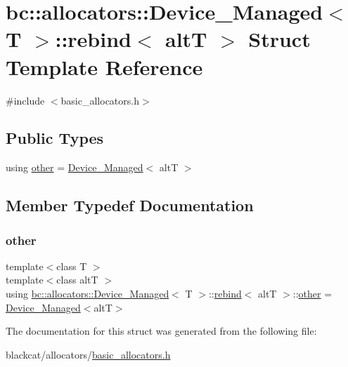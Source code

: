 \hypertarget{structbc_1_1allocators_1_1Device__Managed_1_1rebind}{}\section{bc\+:\+:allocators\+:\+:Device\+\_\+\+Managed$<$ T $>$\+:\+:rebind$<$ altT $>$ Struct Template Reference}
\label{structbc_1_1allocators_1_1Device__Managed_1_1rebind}


{\ttfamily \#include $<$basic\+\_\+allocators.\+h$>$}

\subsection*{Public Types}
\begin{DoxyCompactItemize}
\item 
using \hyperlink{structbc_1_1allocators_1_1Device__Managed_1_1rebind_a112cc45d6e68d7087b8951691a11f202}{other} = \hyperlink{structbc_1_1allocators_1_1Device__Managed}{Device\+\_\+\+Managed}$<$ altT $>$
\end{DoxyCompactItemize}


\subsection{Member Typedef Documentation}
\mbox{\label{structbc_1_1allocators_1_1Device__Managed_1_1rebind_a112cc45d6e68d7087b8951691a11f202}} 
\subsubsection{\texorpdfstring{other}{other}}
{\footnotesize\ttfamily template$<$class T $>$ \\
template$<$class altT $>$ \\
using \hyperlink{structbc_1_1allocators_1_1Device__Managed}{bc\+::allocators\+::\+Device\+\_\+\+Managed}$<$ T $>$\+::\hyperlink{structbc_1_1allocators_1_1Device__Managed_1_1rebind}{rebind}$<$ altT $>$\+::\hyperlink{structbc_1_1allocators_1_1Device__Managed_1_1rebind_a112cc45d6e68d7087b8951691a11f202}{other} =  \hyperlink{structbc_1_1allocators_1_1Device__Managed}{Device\+\_\+\+Managed}$<$altT$>$}



The documentation for this struct was generated from the following file\+:\begin{DoxyCompactItemize}
\item 
blackcat/allocators/\hyperlink{basic__allocators_8h}{basic\+\_\+allocators.\+h}\end{DoxyCompactItemize}
